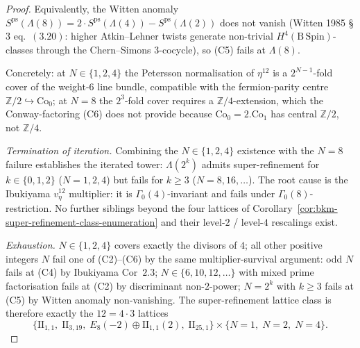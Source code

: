 \begin{proof}[Proof]
Equivalently, the Witten anomaly $S^{\mathrm{ps}}(\Lambda(8))
= 2\cdot S^{\mathrm{ps}}(\Lambda(4)) - S^{\mathrm{ps}}(\Lambda(2))$
does not vanish (Witten 1985 \S$3$ eq.~$(3.20)$: higher
Atkin--Lehner twists generate
non-trivial $H^4(\mathrm{B\,Spin})$-classes through the
Chern--Simons $3$-cocycle), so (C5) fails at $\Lambda(8)$.

Concretely: at $N\in\{1,2,4\}$ the Petersson normalisation of
$\eta^{12}$ is a $2^{N-1}$-fold cover of the weight-$6$ line
bundle, compatible with the fermion-parity centre
$\mathbb{Z}/2\hookrightarrow\mathrm{Co}_0$; at $N=8$ the
$2^3$-fold cover requires a $\mathbb{Z}/4$-extension, which
the Conway-factoring (C6) does not provide because
$\mathrm{Co}_0 = 2.\mathrm{Co}_1$ has central $\mathbb{Z}/2$,
not $\mathbb{Z}/4$.

\emph{Termination of iteration.} Combining the $N\in\{1,2,4\}$
existence with the $N=8$ failure establishes the iterated tower:
$\Lambda(2^k)$ admits super-refinement for $k\in\{0,1,2\}$
($N=1,2,4$) but fails for $k\ge 3$ ($N=8,16,\ldots$).
The root cause is the Ibukiyama $v_\eta^{12}$ multiplier: it is
$\Gamma_0(4)$-invariant and fails under $\Gamma_0(8)$-restriction.
No further siblings beyond the four lattices of
Corollary~\ref{cor:bkm-super-refinement-class-enumeration} and
their level-$2$ / level-$4$ rescalings exist.

\emph{Exhaustion.} $N\in\{1,2,4\}$ covers exactly the divisors
of $4$; all other positive integers $N$ fail one of
(C2)--(C6) by the same multiplier-survival argument:
odd $N$ fails at (C4) by
Ibukiyama Cor~$2.3$; $N\in\{6,10,12,\ldots\}$ with mixed
prime factorisation fails at (C2) by discriminant non-$2$-power;
$N=2^k$ with $k\ge 3$ fails at (C5) by Witten anomaly
non-vanishing. The super-refinement lattice class is therefore
exactly the $12 = 4\cdot 3$ lattices
\[
 \{\mathrm{II}_{1,1},\;\mathrm{II}_{3,19},\;
 E_8(-2)\oplus\mathrm{II}_{1,1}(2),\;\mathrm{II}_{25,1}\}
 \times \{N=1,\;N=2,\;N=4\}.
\]
\end{proof}

